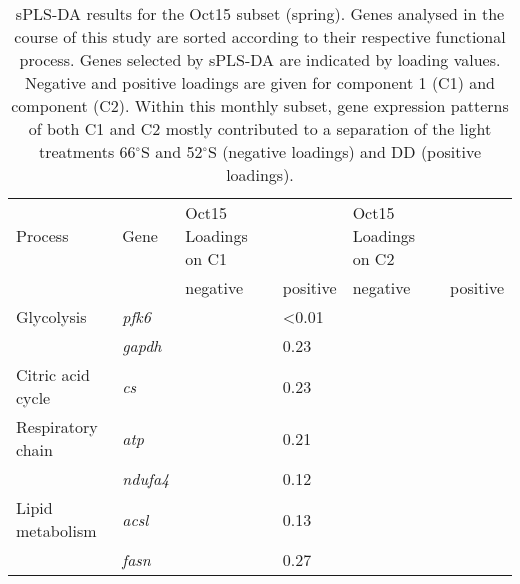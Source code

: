 \begin{table}[]
\caption{sPLS-DA results for the Oct15 subset (spring). Genes analysed in the course of this study are sorted according to their respective functional process. Genes selected by sPLS-DA are indicated by loading values. Negative and positive loadings are given for component 1 (C1) and component (C2). Within this monthly subset, gene expression patterns of both C1 and C2 mostly contributed to a separation of the light treatments 66$^{\circ}$S and 52$^{\circ}$S (negative loadings) and DD (positive loadings).}
\label{pub3_tab7}
\begin{tabular}{@{}llllll@{}}
\toprule
Process                               & Gene            & Oct15 Loadings on C1          &                & Oct15 Loadings on C2          &          \\
                                      &                 & negative                      & positive       & negative                      & positive \\ \midrule
Glycolysis                            & \textit{pfk6}   & \cellcolor[HTML]{C0C0C0}      & \textless 0.01 & \cellcolor[HTML]{C0C0C0}      &          \\
                                      & \textit{gapdh}  & \cellcolor[HTML]{C0C0C0}      & 0.23           & \cellcolor[HTML]{C0C0C0}      &          \\
Citric acid cycle                     & \textit{cs}     & \cellcolor[HTML]{C0C0C0}      & 0.23           & \cellcolor[HTML]{C0C0C0}      &          \\
Respiratory chain                     & \textit{atp}    & \cellcolor[HTML]{C0C0C0}      & 0.21           & \cellcolor[HTML]{C0C0C0}      &          \\
                                      & \textit{ndufa4} & \cellcolor[HTML]{C0C0C0}      & 0.12           & \cellcolor[HTML]{C0C0C0}      &          \\
Lipid metabolism                      & \textit{acsl}   & \cellcolor[HTML]{C0C0C0}      & 0.13           & \cellcolor[HTML]{C0C0C0}      &          \\
                                      & \textit{fasn}   & \cellcolor[HTML]{C0C0C0}      & 0.27           & \cellcolor[HTML]{C0C0C0}      &          \\

\end{tabular}
\end{table}
